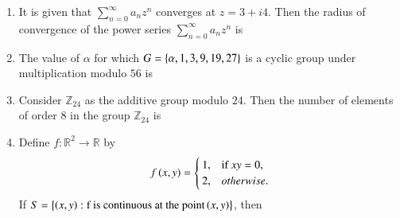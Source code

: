 \documentclass[journal]{IEEEtran}
\begin{document}
\begin{enumerate}
\item It is given that $\sum_{n=0}^{\infty} a_n z^n$ converges at $z=3+i4$. Then the radius of convergence of the power series $\sum_{n=0}^{\infty} a_n z^n$ is
\begin{enumerate}
\end{enumerate}

\item The value of $\alpha$ for which $G=\left\{\alpha,1,3,9,19,27\right\}$ is a cyclic group under multiplication modulo $56$ is
\begin{enumerate}
\end{enumerate}

\item Consider $\mathbb Z_{24}$ as the additive group modulo $24$. Then the number of elements of order $8$ in the group $\mathbb Z_{24}$ is 
\begin{enumerate}
\end{enumerate}

\item Define $f: \mathbb R^2 \rightarrow \mathbb R$ by
\begin{align*}
    f\left(x,y\right)= \begin{cases} 
1, & \text{if } xy=0,\\
2, & otherwise. \\
\end{cases}
\end{align*}
If $S=\left\{\left(x,y\right): \text{f is continuous at the point} \left(x,y\right)\right\}$, then
\begin{enumerate}
\end{enumerate}


\end{enumerate}
\end{document}
